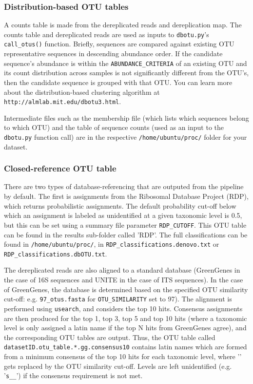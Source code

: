 \documentclass[11pt, oneside]{article}   	%
\begin{document}
\subsubsection{Distribution-based OTU tables}
A counts table is made from the dereplicated reads and 
dereplication map. The counts table and dereplicated reads are
used as inputs to \texttt{dbotu.py}'s \texttt{call\_otus()} function.
Briefly, sequences are compared against existing OTU representative sequences in descending abundance order.
If the candidate sequence's abundance is within the \texttt{ABUNDANCE\_CRITERIA} of an existing OTU and its count distribution
across samples is not significantly different from the OTU's, then
the candidate sequence is grouped with that OTU.
You can learn more about the distribution-based clustering algorithm at \texttt{http://almlab.mit.edu/dbotu3.html}.

Intermediate files such as the membership file (which lists which
sequences belong to which OTU) and the table of sequence counts
(used as an input to the \texttt{dbotu.py} function call)
are in the respective \texttt{/home/ubuntu/proc/} folder for your dataset.

\subsubsection{Closed-reference OTU table}
There are two types of database-referencing that are outputed from the pipeline by default.  The first is assignments from the Ribosomal Database Project (RDP), which returns probabilistic assignments.  The default probability cut-off below which an assignment is labeled as unidentified at a given taxonomic level is 0.5, but this can be set using a summary file parameter {\tt RDP\_CUTOFF}.  This OTU table can be found in the results sub-folder called 'RDP'. 
The full classifications can be found in \texttt{/home/ubuntu/proc/}, in
\texttt{RDP\_classifications.denovo.txt} or \texttt{RDP\_classifications.dbOTU.txt}.

The dereplicated reads are also aligned to a standard database (GreenGenes in the case of 16S sequences and UNITE in the case of ITS sequences).  In the case of GreenGenes, the database is determined based on the specified OTU similarity cut-off: e.g. {\tt 97\_otus.fasta} for {\tt OTU\_SIMILARITY} set to 97).  The alignment is performed using {\tt usearch}, and considers the top 10 hits.  Consensus assignments are then produced for the top 1, top 3, top 5 and top 10 hits (where a taxonomic level is only assigned a latin name if the top N hits from GreenGenes agree), and the corresponding OTU tables are output.  Thus, the OTU table called {\tt datasetID.otu\_table.*.gg.consensus10} contains latin names which are formed from a minimum consensus of the top 10 hits for each taxonomic level, where '{\tt *}' gets replaced by the OTU similarity cut-off.  Levels are left unidentified (e.g. '{\tt s\_\_}') if the consensus requirement is not met.  
\end{document}
